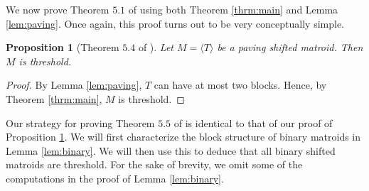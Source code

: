 \documentclass{amsart}
\theoremstyle{definition}
\theoremstyle{plain}
\newtheorem{prop}[defn]{Proposition}
\begin{document}
We now prove Theorem $5.1$ of \cite{DO} using both Theorem \ref{thrm:main} and Lemma \ref{lem:paving}. Once again, this proof turns out to be very conceptually simple. 

\begin{prop}[Theorem $5.4$ of \cite{DO}]
  \label{prop:easy}
Let $M=\langle T \rangle $ be a paving shifted matroid. Then $M$ is threshold.
\end{prop}
\begin{proof}
By Lemma \ref{lem:paving}, $T$ can have at most two blocks. Hence, by Theorem \ref{thrm:main}, $M$ is threshold.
\end{proof}

Our strategy for proving Theorem $5.5$ of \cite{DO} is identical to that of our proof of Proposition \ref{prop:easy}. We will first characterize the block structure of binary matroids in Lemma \ref{lem:binary}. We will then use this to deduce that all binary shifted matroids are threshold. For the sake of brevity, we omit some of the computations in the proof of Lemma \ref{lem:binary}.
\end{document}
